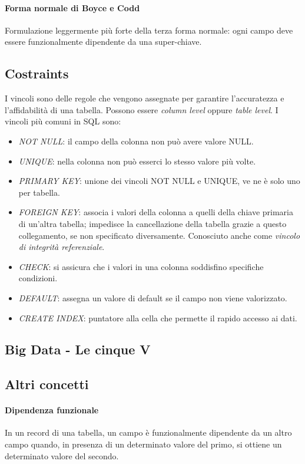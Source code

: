 \documentclass{article}
\begin{document}
        \paragraph{Forma normale di Boyce e Codd} Formulazione leggermente più forte della terza forma normale: ogni campo deve essere funzionalmente dipendente da una super-chiave.
    
    \subsection{Costraints}
        I vincoli sono delle regole che vengono assegnate per garantire l'accuratezza e l'affidabilità di una tabella. Possono essere \textit{column level} oppure \textit{table level}. I vincoli più comuni in SQL sono:
        \begin{itemize}
            \item \textit{NOT NULL}: il campo della colonna non può avere valore NULL.
            \item \textit{UNIQUE}: nella colonna non può esserci lo stesso valore più volte.
            \item \textit{PRIMARY KEY}: unione dei vincoli NOT NULL e UNIQUE, ve ne è solo uno per tabella.
            \item \textit{FOREIGN KEY}: associa i valori della colonna a quelli della chiave primaria di un'altra tabella; impedisce la cancellazione della tabella grazie a questo collegamento, se non specificato diversamente. Conosciuto anche come \textit{vincolo di integrità referenziale}.
            \item \textit{CHECK}: si assicura che i valori in una colonna soddisfino specifiche condizioni.
            \item \textit{DEFAULT}: assegna un valore di default se il campo non viene valorizzato.
            \item \textit{CREATE INDEX}: puntatore alla cella che permette il rapido accesso ai dati.
        \end{itemize}
    
    \subsection{Big Data - Le cinque V}
    
    \subsection{Altri concetti}
        \paragraph{Dipendenza funzionale} In un record di una tabella, un campo è funzionalmente dipendente da un altro campo quando, in presenza di un determinato valore del primo, si ottiene un determinato valore del secondo.
\end{document}
